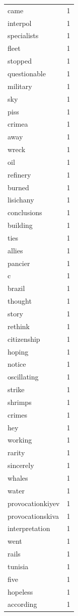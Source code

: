 \begin{tabular}{lr}
came & 1 \\
interpol & 1 \\
specialists & 1 \\
fleet & 1 \\
stopped & 1 \\
questionable & 1 \\
military & 1 \\
sky & 1 \\
piss & 1 \\
crimea & 1 \\
away & 1 \\
wreck & 1 \\
oil & 1 \\
refinery & 1 \\
burned & 1 \\
lisichany & 1 \\
conclusions & 1 \\
building & 1 \\
ties & 1 \\
allies & 1 \\
pancier & 1 \\
c & 1 \\
brazil & 1 \\
thought & 1 \\
story & 1 \\
rethink & 1 \\
citizenship & 1 \\
hoping & 1 \\
notice & 1 \\
oscillating & 1 \\
strike & 1 \\
shrimps & 1 \\
crimes & 1 \\
hey & 1 \\
working & 1 \\
rarity & 1 \\
sincerely & 1 \\
whales & 1 \\
water & 1 \\
provocationkiyev & 1 \\
provocationskiva & 1 \\
interpretation & 1 \\
went & 1 \\
rails & 1 \\
tunisia & 1 \\
five & 1 \\
hopeless & 1 \\
according & 1 \\

\end{tabular}
